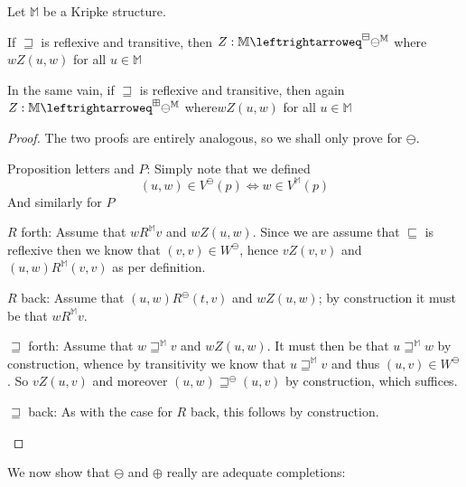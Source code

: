 \begin{lemma}
Let $\mathbb{M}$ be a Kripke structure.

If $\sqsupseteq$ is reflexive and transitive, then $Z: \mathbb{M}
\leftrightarroweq^\BM \ominus^\mathbb{M}$ where$w Z (u,w)$ for all $u \in \mathbb{M}$

In the same vain, if $\sqsupseteq$ is reflexive and transitive, then
again $Z: \mathbb{M}
\leftrightarroweq^\BP \ominus^\mathbb{M}$ where$w Z (u,w)$ for all $u \in \mathbb{M}$
\end{lemma}
\begin{proof}
The two proofs are entirely analogous, so we shall only prove for
$\ominus$.
\begin{bul}
  \item Proposition letters and $P$:  Simply note that we defined
\[ (u,w) \in V^\ominus(p) \iff w \in V^{\mathbb{M}}(p) \]
And similarly for $P$
\item $R$ forth:  Assume that $w R^\mathbb{M} v$ and $w Z (u,w)$.
  Since we are assume that $\sqsubseteq$ is reflexive then we know
  that $(v,v) \in W^\ominus$, hence $v Z (v,v)$ and $(u,w)
  R^\mathbb{M} (v,v)$ as per definition.
\item $R$ back:  Assume that $(u,w) R^\ominus (t,v)$ and $w Z (u,w)$;
  by construction it must be that $w R^{\mathbb{M}} v$.
\item $\sqsupseteq$ forth:  Assume that $w \sqsupseteq^{\mathbb{M}} v$ and $w Z
  (u,w)$.  It must then be that $u \sqsupseteq^{\mathbb{M}} w$ by construction,
  whence by transitivity we know that $u \sqsupseteq^{\mathbb{M}} v$ and thus
  $(u,v) \in W^\ominus$.  So $v Z (u,v)$ and moreover $(u,w)
  \sqsupseteq^\ominus (u,v)$ by construction, which suffices.
\item $\sqsupseteq$ back: As with the case for $R$ back, this follows
  by construction.
\end{bul}
\end{proof}

We now show that $\ominus$ and $\oplus$ really are adequate completions:

